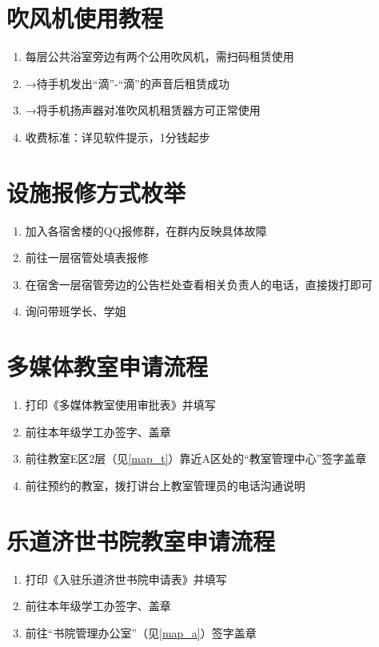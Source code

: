 \section[吹风机使用教程]{吹风机使用教程}
\label{hair_drier}
\begin{enumerate}
    \item 每层公共浴室旁边有两个公用吹风机，需扫码\footnotemark 租赁使用
    \item →待手机发出“滴”-“滴”的声音后租赁成功
    \item →将手机扬声器对准吹风机租赁器方可正常使用
    \item 收费标准：详见软件提示，1分钱起步
\end{enumerate}

\section[设施报修方式枚举]{设施报修方式枚举}
\label{repair_report}
\begin{enumerate}
    \item 加入各宿舍楼的QQ报修群，在群内反映具体故障
    \item 前往一层宿管处填表报修
    \item 在宿舍一层宿管旁边的公告栏处查看相关负责人的电话，直接拨打即可
    \item 询问带班学长、学姐
\end{enumerate}

\section[多媒体教室申请流程]{多媒体教室申请流程}
\begin{enumerate}
    \item 打印《多媒体教室使用审批表》并填写
    \item 前往本年级学工办签字、盖章
    \item 前往教室E区2层（见\uline{\ref{map_t}}）靠近A区处的“教室管理中心”签字盖章
    \item 前往预约的教室，拨打讲台上教室管理员的电话沟通说明
\end{enumerate}

\section[乐道济世书院教室申请流程]{乐道济世书院教室申请流程}
\begin{enumerate}
    \item 打印《入驻乐道济世书院申请表》并填写
    \item 前往本年级学工办签字、盖章
    \item 前往“书院管理办公室”（见\uline{\ref{map_a}}）签字盖章
\end{enumerate}

